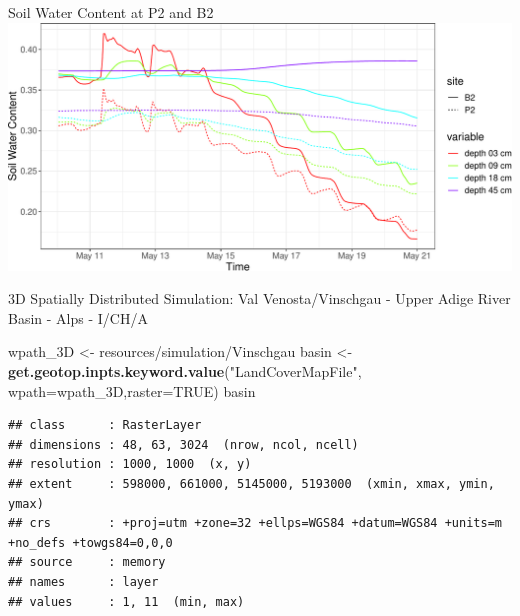 \documentclass[
  ignorenonframetext,
]{beamer}
\newenvironment{Shaded}{\begin{snugshade}}{\end{snugshade}}
\newcommand{\DataTypeTok}[1]{\textcolor[rgb]{0.13,0.29,0.53}{#1}}
\newcommand{\KeywordTok}[1]{\textcolor[rgb]{0.13,0.29,0.53}{\textbf{#1}}}
\newcommand{\NormalTok}[1]{#1}
\newcommand{\OtherTok}[1]{\textcolor[rgb]{0.56,0.35,0.01}{#1}}
\newcommand{\StringTok}[1]{\textcolor[rgb]{0.31,0.60,0.02}{#1}}
\begin{document}
\begin{frame}{Soil Water Content at P2 and B2}
\protect\hypertarget{soil-water-content-at-p2-and-b2}{}
\includegraphics{cordanoe_geotopbricks_presenetation_files/figure-beamer/unnamed-chunk-8-1.pdf}
\end{frame}

\begin{frame}[fragile]{3D Spatially Distributed Simulation: Val
Venosta/Vinschgau - Upper Adige River Basin - Alps - I/CH/A}
\protect\hypertarget{d-spatially-distributed-simulation-val-venostavinschgau---upper-adige-river-basin---alps---icha}{}
\begin{Shaded}
\begin{Highlighting}[]
\NormalTok{wpath\_3D <{-}}\StringTok{ \textquotesingle{}resources/simulation/Vinschgau\textquotesingle{}}
\NormalTok{basin <{-}}\StringTok{ }\KeywordTok{get.geotop.inpts.keyword.value}\NormalTok{(}\StringTok{"LandCoverMapFile"}\NormalTok{,}
              \DataTypeTok{wpath=}\NormalTok{wpath\_3D,}\DataTypeTok{raster=}\OtherTok{TRUE}\NormalTok{)}
\NormalTok{basin}
\end{Highlighting}
\end{Shaded}

\begin{verbatim}
## class      : RasterLayer 
## dimensions : 48, 63, 3024  (nrow, ncol, ncell)
## resolution : 1000, 1000  (x, y)
## extent     : 598000, 661000, 5145000, 5193000  (xmin, xmax, ymin, ymax)
## crs        : +proj=utm +zone=32 +ellps=WGS84 +datum=WGS84 +units=m +no_defs +towgs84=0,0,0 
## source     : memory
## names      : layer 
## values     : 1, 11  (min, max)
\end{verbatim}
\end{frame}
\end{document}
